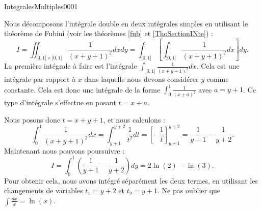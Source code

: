 \begin{corrige}{IntegralesMultiples0001}

	Nous décomposons l'intégrale double en deux intégrales simples en utilisant le théorème de Fubini (voir les théorèmes \ref{fub} et \ref{ThoSectionINte}) :
	\begin{equation}
		I=\iint_{\mathopen[ 0 , 1 \mathclose]\times\mathopen[ 0 , 1 \mathclose]}\frac{1}{ (x+y+1)^2 }dxdy= \int_{\mathopen[ 0 , 1 \mathclose]}\left[ \int_{\mathopen[ 0 , 1 \mathclose]}\frac{1}{ (x+y+1)^2 }dx \right]dy.
	\end{equation}
	La première intégrale à faire est l'intégrale $\int_{\mathopen[ 0 , 1 \mathclose]}\frac{1}{ (x+y+1)^2 }dx$. Cela est une intégrale par rapport à $x$ dans laquelle nous devons considérer $y$ comme constante. Cela est donc une intégrale de la forme $\int_{0}^1\frac{1}{ (x+a)^2 }$ avec $a=y+1$. Ce type d'intégrale s'effectue en posant $t=x+a$.

	Nous posons donc  $t=x+y+1$, et nous calculons :
	\begin{equation}
		\int_0^1\frac{1}{ (x+y+1)^2 }dx=\int_{y+1}^{y+2}\frac{1}{ t^2 }dt=\left[ -\frac{1}{ t } \right]_{y+1}^{y+2}=\frac{1}{ y+1 }-\frac{1}{ y+2 }.
	\end{equation}
	Maintenant nous pouvons poursuivre :
	\begin{equation}
		I=\int_0^1\left( \frac{1}{ y+1 }-\frac{1}{ y+2 } \right)dy=2\ln(2)-\ln(3).
	\end{equation}
	Pour obtenir cela, nous avons intégré séparément les deux termes, en utilisant les changements de variables $t_1=y+2$ et $t_2=y+1$. Ne pas oublier que $\int \frac{dx}{ x }=\ln(x)$.

\end{corrige}
